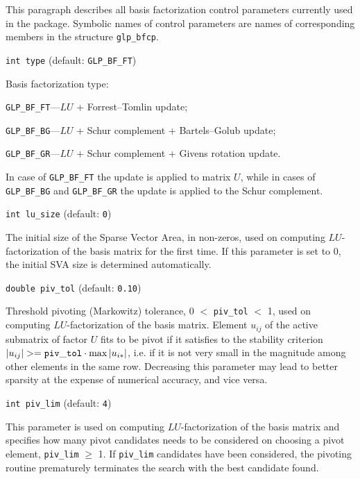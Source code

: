 
This paragraph describes all basis factorization control parameters
currently used in the package. Symbolic names of control parameters are
names of corresponding members in the structure \verb|glp_bfcp|.

\medskip

{\tt int type} (default: {\tt GLP\_BF\_FT})

Basis factorization type:

\verb|GLP_BF_FT|---$LU$ + Forrest--Tomlin update;

\verb|GLP_BF_BG|---$LU$ + Schur complement + Bartels--Golub update;

\verb|GLP_BF_GR|---$LU$ + Schur complement + Givens rotation update.

In case of \verb|GLP_BF_FT| the update is applied to matrix $U$, while
in cases of \verb|GLP_BF_BG| and \verb|GLP_BF_GR| the update is applied
to the Schur complement.

\medskip

{\tt int lu\_size} (default: {\tt 0})

The initial size of the Sparse Vector Area, in non-zeros, used on
computing $LU$-factorization of the basis matrix for the first time.
If this parameter is set to 0, the initial SVA size is determined
automatically.

\medskip

{\tt double piv\_tol} (default: {\tt 0.10})

Threshold pivoting (Markowitz) tolerance, 0 $<$ \verb|piv_tol| $<$ 1,
used on computing $LU$-factoriza\-tion of the basis matrix. Element
$u_{ij}$ of the active submatrix of factor $U$ fits to be pivot if it
satisfies to the stability criterion
$|u_{ij}| >= {\tt piv\_tol}\cdot\max|u_{i*}|$, i.e. if it is not very
small in the magnitude among other elements in the same row. Decreasing
this parameter may lead to better sparsity at the expense of numerical
accuracy, and vice versa.

\medskip

{\tt int piv\_lim} (default: {\tt 4})

This parameter is used on computing $LU$-factorization of the basis
matrix and specifies how many pivot candidates needs to be considered
on choosing a pivot element, \verb|piv_lim| $\geq$ 1. If \verb|piv_lim|
candidates have been considered, the pivoting routine prematurely
terminates the search with the best candidate found.

\newpage


